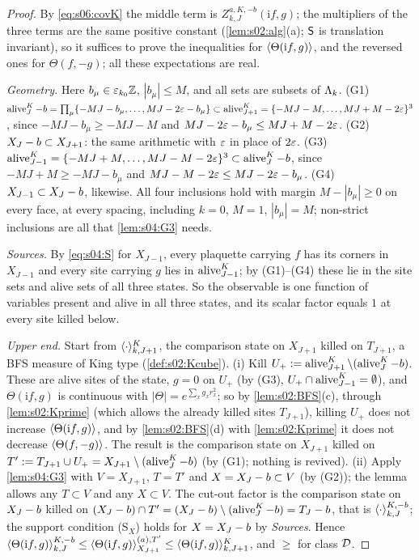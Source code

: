 \begin{proof}
By \eqref{eq:s06:covK} the middle term is $Z^{a,K,-b}_{k,J}(\mathrm if,g)$; the multipliers of the three terms are the same positive constant (\cref{lem:s02:alg}(a); $\mathsf S$ is translation invariant), so it suffices to prove the inequalities for $\langle \Theta(\mathrm if,g)\rangle$, and the reversed ones for $\Theta(f,-g)$; all these expectations are real.

\emph{Geometry.} Here $b_\mu\in\varepsilon_{k_0}\mathbb Z$, $|b_\mu|\le M$, and all sets are subsets of $\Lambda_k$. (G1) $\operatorname{alive}^K_J-b=\prod_\mu\{-MJ-b_\mu,\dots,MJ-2\varepsilon-b_\mu\}\subset\operatorname{alive}^K_{J+1}=\{-MJ-M,\dots,MJ+M-2\varepsilon\}^3$, since $-MJ-b_\mu\ge-MJ-M$ and $MJ-2\varepsilon-b_\mu\le MJ+M-2\varepsilon$. (G2) $X_J-b\subset X_{J+1}$: the same arithmetic with $\varepsilon$ in place of $2\varepsilon$. (G3) $\operatorname{alive}^K_{J-1}=\{-MJ+M,\dots,MJ-M-2\varepsilon\}^3\subset\operatorname{alive}^K_J-b$, since $-MJ+M\ge-MJ-b_\mu$ and $MJ-M-2\varepsilon\le MJ-2\varepsilon-b_\mu$. (G4) $X_{J-1}\subset X_J-b$, likewise. All four inclusions hold with margin $M-|b_\mu|\ge0$ on every face, at every spacing, including $k=0$, $M=1$, $|b_\mu|=M$; non-strict inclusions are all that \cref{lem:s04:G3} needs.

\emph{Sources.} By \eqref{eq:s04:S} for $X_{J-1}$, every plaquette carrying $f$ has its corners in $X_{J-1}$ and every site carrying $g$ lies in $\operatorname{alive}^K_{J-1}$; by (G1)--(G4) these lie in the site sets and alive sets of all three states. So the observable is one function of variables present and alive in all three states, and its scalar factor equals $1$ at every site killed below.

\emph{Upper end.} Start from $\langle \cdot\rangle^K_{k,J+1}$, the comparison state on $X_{J+1}$ killed on $T_{J+1}$, a BFS measure of King type (\cref{def:s02:Kcube}). (i) Kill $U_+:=\operatorname{alive}^K_{J+1}\setminus(\operatorname{alive}^K_J-b)$. These are alive sites of the state, $g=0$ on $U_+$ (by (G3), $U_+\cap\operatorname{alive}^K_{J-1}=\emptyset$), and $\Theta(\mathrm if,g)$ is continuous with $|\Theta|=e^{\sum_xg_xr_x^2}$; so by \cref{lem:s02:BFS}(c), through \cref{lem:s02:Kprime} (which allows the already killed sites $T_{J+1}$), killing $U_+$ does not increase $\langle \Theta(\mathrm if,g)\rangle$, and by \cref{lem:s02:BFS}(d) with \cref{lem:s02:Kprime} it does not decrease $\langle \Theta(f,-g)\rangle$. The result is the comparison state on $X_{J+1}$ killed on $T':= T_{J+1}\cup U_+=X_{J+1}\setminus(\operatorname{alive}^K_J-b)$ (by (G1); nothing is revived). (ii) Apply \cref{lem:s04:G3} with $V=X_{J+1}$, $T=T'$ and $X=X_J-b\subset V$ (by (G2)); the lemma allows any $T\subset V$ and any $X\subset V$. The cut-out factor is the comparison state on $X_J-b$ killed on $(X_J-b)\cap T'=(X_J-b)\setminus(\operatorname{alive}^K_J-b)=T_J-b$, that is $\langle \cdot\rangle^{K,-b}_{k,J}$; the support condition (S$_X$) holds for $X=X_J-b$ by \emph{Sources}. Hence $\langle \Theta(\mathrm if,g)\rangle^{K,-b}_{k,J}\le\langle \Theta(\mathrm if,g)\rangle^{(a),T'}_{X_{J+1}}\le\langle \Theta(\mathrm if,g)\rangle^K_{k,J+1}$, and $\ge$ for class $\mathcal D$.


\end{proof}
